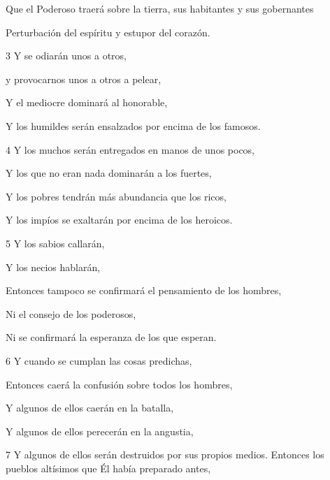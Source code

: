 \par Que el Poderoso traerá sobre la tierra, sus habitantes y sus gobernantes

\par Perturbación del espíritu y estupor del corazón.

\par 3 Y se odiarán unos a otros,

\par y provocarnos unos a otros a pelear,

\par Y el mediocre dominará al honorable,

\par Y los humildes serán ensalzados por encima de los famosos.

\par 4 Y los muchos serán entregados en manos de unos pocos,

\par Y los que no eran nada dominarán a los fuertes,

\par Y los pobres tendrán más abundancia que los ricos,

\par Y los impíos se exaltarán por encima de los heroicos.

\par 5 Y los sabios callarán,

\par Y los necios hablarán,

\par Entonces tampoco se confirmará el pensamiento de los hombres,

\par Ni el consejo de los poderosos,

\par Ni se confirmará la esperanza de los que esperan.

\par 6 Y cuando se cumplan las cosas predichas,

\par Entonces caerá la confusión sobre todos los hombres,

\par Y algunos de ellos caerán en la batalla,

\par Y algunos de ellos perecerán en la angustia,

\par 7 Y algunos de ellos serán destruidos por sus propios medios. Entonces los pueblos altísimos que Él había preparado antes,

